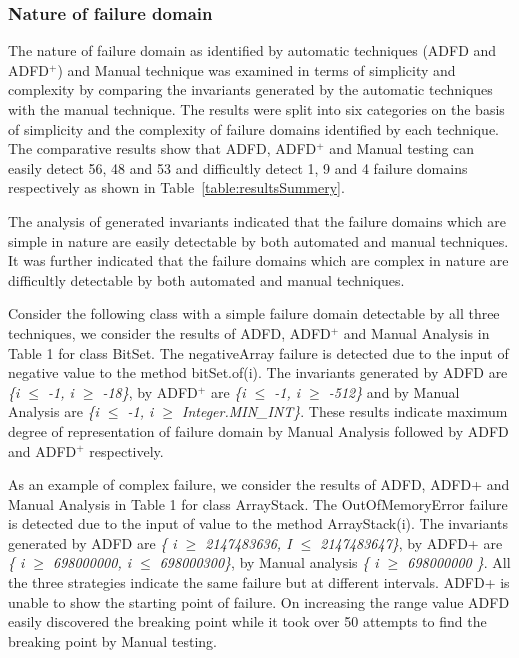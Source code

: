 \subsubsection{Nature of failure domain} \label{sec:nature}
The nature of failure domain as identified by automatic techniques (ADFD and ADFD$^+$) and Manual technique was examined in terms of simplicity and complexity by comparing the invariants generated by the automatic techniques with the manual technique. The results were split into six categories on the basis of simplicity and the complexity of failure domains identified by each technique. The comparative results show that ADFD, ADFD$^+$ and Manual testing can easily detect 56, 48 and 53 and difficultly detect 1, 9 and 4 failure domains respectively as shown in Table~\ref{table:resultsSummery}.

The analysis of generated invariants indicated that the failure domains which are simple in nature are easily detectable by both automated and manual techniques. It was further indicated that the failure domains which are complex in nature are difficultly detectable by both automated and manual techniques. %

Consider the following class with a simple failure domain detectable by all three techniques, we consider the results of ADFD, ADFD$^+$ and Manual Analysis in Table 1 for class BitSet. The negativeArray failure is detected due to the input of negative value to the method bitSet.of(i). The invariants generated by ADFD are \textit{\{i $\le$ -1, i $\ge$ -18\}}, by ADFD$^+$ are \textit{\{i $\le$ -1, i $\ge$ -512\}} and by Manual Analysis are \textit{\{i $\le$ -1, i $\ge$ Integer.MIN\_INT\}}. These results indicate maximum degree of representation of failure domain by Manual Analysis followed by ADFD and ADFD$^+$ respectively.


As an example of complex failure, we consider the results of ADFD, ADFD+ and Manual Analysis in Table 1 for class ArrayStack. The OutOfMemoryError failure is detected due to the input of value to the method ArrayStack(i). The invariants generated by ADFD are \textit{\{ i $\ge$ 2147483636, I $\le$ 2147483647\}}, by ADFD+ are \textit{\{ i $\ge$ 698000000, i $\le$ 698000300\}}, by Manual analysis \textit{\{ i $\ge$ 698000000 \}}. All the three strategies indicate the same failure but at different intervals. ADFD+ is unable to show the starting point of failure. On increasing the range value ADFD easily discovered the breaking point while it took over 50 attempts to find the breaking point by Manual testing.



